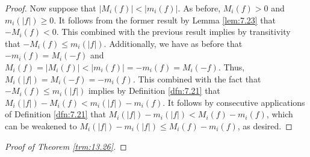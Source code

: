 \documentclass[../main.tex]{subfiles}
\begin{document}
\begin{theorem}
\begin{lemma*}
\begin{proof}
            Now suppose that $|M_i(f)|<|m_i(f)|$. As before, $M_i(f)>0$ and $m_i(|f|)\geq 0$. It follows from the former result by Lemma \ref{lem:7.23} that $-M_i(f)<0$. This combined with the previous result implies by transitivity that $-M_i(f)\leq m_i(|f|)$. Additionally, we have as before that $-m_i(f)=M_i(-f)$ and $M_i(f)=|M_i(f)|<|m_i(f)|=-m_i(f)=M_i(-f)$. Thus, $M_i(|f|)=M_i(-f)=-m_i(f)$. This combined with the fact that $-M_i(f)\leq m_i(|f|)$ implies by Definition \ref{dfn:7.21} that $M_i(|f|)-M_i(f)<m_i(|f|)-m_i(f)$. It follows by consecutive applications of Definition \ref{dfn:7.21} that $M_i(|f|)-m_i(|f|)<M_i(f)-m_i(f)$, which can be weakened to $M_i(|f|)-m_i(|f|)\leq M_i(f)-m_i(f)$, as desired.
        \end{proof}
    \end{lemma*}
    \begin{proof}[Proof of Theorem \ref{trm:13.26}]



\end{proof}
\end{theorem}
\end{document}

